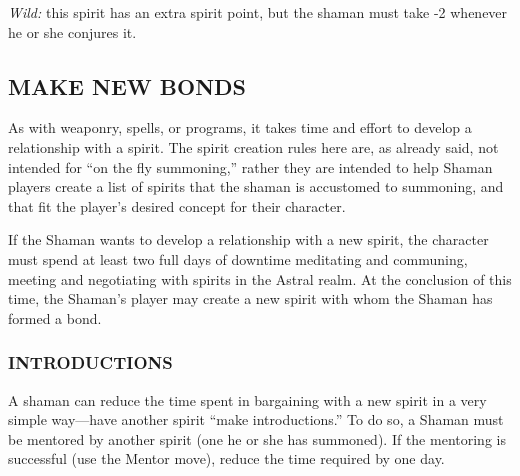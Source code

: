 \documentclass[oneside,10pt]{article}
\begin{document}
\begin{multicols}{2}
\begin{dent}
\textit{Wild:} this spirit has an extra spirit point, but the shaman
must take -2 whenever he or she conjures it.
\end{dent}
\subsection{MAKE NEW BONDS}
As with weaponry, spells, or programs, it takes time and effort to develop a relationship with a spirit. The spirit creation
rules here are, as already said, not intended for ``on the fly
summoning,'' rather they are intended to help Shaman players create a list of spirits that the shaman is accustomed to
summoning, and that fit the player’s desired concept for their
character.

If the Shaman wants to develop a relationship with a new
spirit, the character must spend at least two full days of
downtime meditating and communing, meeting and negotiating with spirits in the Astral realm. At the conclusion of this
time, the Shaman’s player may create a new spirit with whom
the Shaman has formed a bond.

\subsubsection{INTRODUCTIONS}
A shaman can reduce the time spent in bargaining with a
new spirit in a very simple way—have another spirit ``make
introductions.'' To do so, a Shaman must be mentored by another spirit (one he or she has summoned). If the mentoring
is successful (use the Mentor move), reduce the time required
by one day.

\end{multicols}

\end{document}

